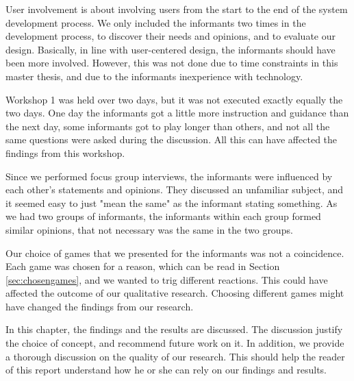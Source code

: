 User involvement is about involving users from the start to the end of the system development process. We only included the informants two times in the development process, to discover their needs and opinions, and to evaluate our design. Basically, in line with user-centered design, the informants should have been more involved. However, this was not done due to time constraints in this master thesis, and due to the informants inexperience with technology. 

Workshop 1 was held over two days, but it was not executed exactly equally the two days. One day the informants got a little more instruction and guidance than the next day, some informants got to play longer than others, and not all the same questions were asked during the discussion. All this can have affected the findings from this workshop.  

Since we performed focus group interviews, the informants were influenced by each other's statements and opinions. They discussed an unfamiliar subject, and it seemed easy to just "mean the same" as the informant stating something. As we had two groups of informants, the informants within each group formed similar opinions, that not necessary was the same in the two groups.
   
Our choice of games that we presented for the informants was not a coincidence. Each game was chosen for a reason, which can be read in Section \ref{sec:chosengames}, and we wanted to trig different reactions. This could have affected the outcome of our qualitative research. Choosing different games might have changed the findings from our research. 

In this chapter, the findings and the results are discussed. The discussion justify the choice of concept, and recommend future work on it. In addition, we provide a thorough discussion on the quality of our research. This should help the reader of this report understand how he or she can rely on our findings and results.


